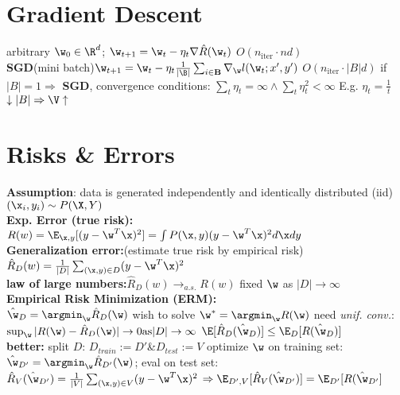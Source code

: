 \section*{Gradient Descent}
arbitrary $\w_0 \in \R^d$;
$\w_{t+1}=\w_t-\eta_t\nabla\hat R(\w_t)$
$O(n_{\text{iter}} \cdot  n d)$\\
\textbf{SGD}(mini batch)$\w_{t+1}=\w_t-\eta_t\frac{1}{|\B|}\sum_{i\in \mathbf{B}}\nabla_{\w}l(\w_t;x',y')$
$O(n_{\text{iter}} \cdot |B| d)$ if $|B|=1\Rightarrow$  \textbf{SGD}, convergence conditions:
$\sum_t\eta_t=\infty \land\sum_t\eta_t^2<\infty$ E.g. $\eta_t=\frac{1}{t}$
$\downarrow|B|\Rightarrow \V \uparrow$
\section*{Risks \& Errors}
\textbf{Assumption}: data is generated independently and identically distributed (iid) $(\x_i,y_i)\sim P(\X,Y)$\\
\textbf{Exp. Error (true risk):}
$R(w)=\E_{\x,y}[(y-\w^T\x)^2]=\int P(\x, y)(y-\w^T\x)^2d\x dy$ \\
\textbf{Generalization error:}(estimate true risk by empirical risk) \\
$\hat R_D(w)=\frac{1}{|D|}\sum_{(\x,y)\in D}(y-\w^T\x)^2$\\
\textbf{law of large numbers:}$\hat R_D(w)\rightarrow_{a.s.} R(w)$ fixed $\w$ as $|D|\rightarrow \infty$\\
\textbf{Empirical Risk Minimization (ERM):}\\
$\hat\w_D=\argmin_\w\hat R_D(\w)$ wish to solve $\w^*=\argmin_\w R(\w)$
need \textit{unif. conv.}:
$\sup_\w |R(\w)-\hat R_D(\w)|\rightarrow0 \mathrm{as} |D|\rightarrow\infty$
$\E[\hat R_D(\hat \w_D)]\leq \E_D[R(\hat \w_D)]$\\
\textbf{better:} split $D$: $D_{train}:=D'$\&$D_{test}:=V$ optimize $\w$ on training set: $\hat \w_{D'}=\argmin_\w\hat R_{D'}(\w)$;
eval on test set: $\hat R_V(\hat\w_{D'})=\frac{1}{|V|}\sum_{(\x,y)\in V}(y-\w^T\x)^2$ $\Rightarrow \E_{D',V}[\hat R_V(\hat \w_{D'})]=\E_{D'}[R(\hat\w_{D'}]$
\fi

